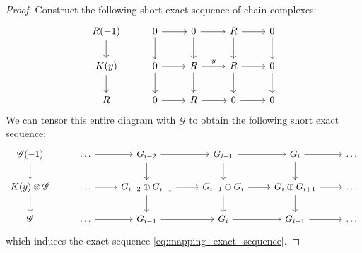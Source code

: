 \documentclass[12pt]{article}
\theoremstyle{plain}
\theoremstyle{definition}
\newcommand{\scr}[1]{\mathscr{#1}}
\begin{document}
	\begin{proof}
		Construct the following short exact sequence of chain complexes:
		\begin{equation}
			\begin{tikzcd}
				R(-1)\arrow[d] & 0\arrow[r]\arrow[d] & 0\arrow[r]\arrow[d] & R\arrow[r]\arrow[d] & 0\arrow[d]\\
				K(y)\arrow[d] & 0\arrow[r]\arrow[d] & R\arrow[r,"{y}"]\arrow[d] & R\arrow[r]\arrow[d] & 0\arrow[d]\\
				R &0\arrow[r] & R\arrow[r] & 0\arrow[r] & 0
			\end{tikzcd}
		\end{equation}
		We can tensor this entire diagram with $\scr{G}$ to obtain the following short exact sequence:
		\begin{equation}
			\begin{tikzcd}
				\scr{G}(-1)\arrow[d] & \hdots\arrow[r] & G_{i-2}\arrow[r]\arrow[d] & G_{i-1}\arrow[r]\arrow[d] & G_i\arrow[r]\arrow[d] & \hdots\\
				K(y)\otimes \scr{G}\arrow[d] & \hdots\arrow[r] & G_{i-2} \oplus G_{i-1}\arrow[r]\arrow[d] & G_{i-1} \oplus G_i\arrow[r]\arrow[d]\arrow[r] & G_{i} \oplus G_{i+1}\arrow[r]\arrow[d] & \hdots\\
				\scr{G} & \hdots\arrow[r] & G_{i-1}\arrow[r] & G_i\arrow[r] & G_{i+1}\arrow[r] & \hdots
			\end{tikzcd}
		\end{equation}
		which induces the exact sequence \eqref{eq:mapping_exact_sequence}.
	\end{proof}
	
\end{document}
